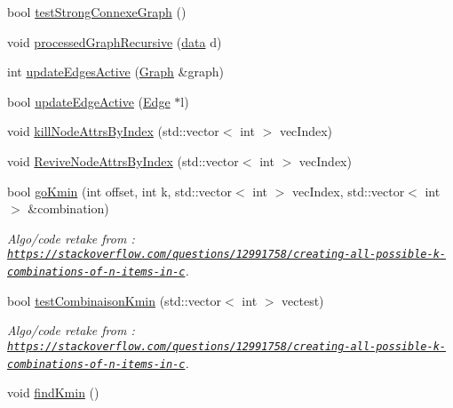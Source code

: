 \begin{DoxyCompactItemize}
\item 
bool \mbox{\hyperlink{struct_algorithm_a9a76807cae303dac7bcac84e18b00c86}{test\+Strong\+Connexe\+Graph}} ()
\item 
void \mbox{\hyperlink{struct_algorithm_aa3909b7cd8efd5c0d2351bcb7923e888}{processed\+Graph\+Recursive}} (\mbox{\hyperlink{_graph_8h_a98cbe1f79429fc62806b32b6e8871d9e}{data}} d)
\item 
int \mbox{\hyperlink{struct_algorithm_a75651c6f1997fa2db893b4b3d4a467d8}{update\+Edges\+Active}} (\mbox{\hyperlink{class_graph}{Graph}} \&graph)
\item 
bool \mbox{\hyperlink{struct_algorithm_af2d2eace16e689391c4b11e205251657}{update\+Edge\+Active}} (\mbox{\hyperlink{class_edge}{Edge}} $\ast$l)
\item 
void \mbox{\hyperlink{struct_algorithm_a1cfa3e81c301424fcb77642926abd66e}{kill\+Node\+Attrs\+By\+Index}} (std\+::vector$<$ int $>$ vec\+Index)
\item 
void \mbox{\hyperlink{struct_algorithm_a3254a9cd92b951a41d1d9cd931e6672b}{Revive\+Node\+Attrs\+By\+Index}} (std\+::vector$<$ int $>$ vec\+Index)
\item 
bool \mbox{\hyperlink{struct_algorithm_a6596dc464bb675414435c341a76cd2b6}{go\+Kmin}} (int offset, int k, std\+::vector$<$ int $>$ vec\+Index, std\+::vector$<$ int $>$ \&combination)
\begin{DoxyCompactList}\small\item\em Algo/code retake from \+: \href{https://stackoverflow.com/questions/12991758/creating-all-possible-k-combinations-of-n-items-in-c}{\tt https\+://stackoverflow.\+com/questions/12991758/creating-\/all-\/possible-\/k-\/combinations-\/of-\/n-\/items-\/in-\/c}. \end{DoxyCompactList}\item 
bool \mbox{\hyperlink{struct_algorithm_a9531505ffb0b7f99320dee47e97376bc}{test\+Combinaison\+Kmin}} (std\+::vector$<$ int $>$ vectest)
\begin{DoxyCompactList}\small\item\em Algo/code retake from \+: \href{https://stackoverflow.com/questions/12991758/creating-all-possible-k-combinations-of-n-items-in-c}{\tt https\+://stackoverflow.\+com/questions/12991758/creating-\/all-\/possible-\/k-\/combinations-\/of-\/n-\/items-\/in-\/c}. \end{DoxyCompactList}\item 
void \mbox{\hyperlink{struct_algorithm_a83933a235de08f4eb72485921a2c576c}{find\+Kmin}} ()
\item 

\end{DoxyCompactItemize}
